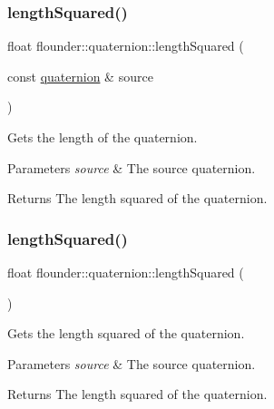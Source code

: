 \subsubsection{\texorpdfstring{length\+Squared()}{lengthSquared()}\hspace{0.1cm}{\footnotesize\ttfamily [1/2]}}
{\footnotesize\ttfamily float flounder\+::quaternion\+::length\+Squared (\begin{DoxyParamCaption}\item[{const \hyperlink{classflounder_1_1quaternion}{quaternion} \&}]{source }\end{DoxyParamCaption})\hspace{0.3cm}{\ttfamily [static]}}



Gets the length of the quaternion. 


\begin{DoxyParams}{Parameters}
{\em source} & The source quaternion. \\
\hline
\end{DoxyParams}
\begin{DoxyReturn}{Returns}
The length squared of the quaternion. 
\end{DoxyReturn}
\mbox{\label{classflounder_1_1quaternion_a3513c1cae67023bab1f4647abf6f9075}} 
\subsubsection{\texorpdfstring{length\+Squared()}{lengthSquared()}\hspace{0.1cm}{\footnotesize\ttfamily [2/2]}}
{\footnotesize\ttfamily float flounder\+::quaternion\+::length\+Squared (\begin{DoxyParamCaption}{ }\end{DoxyParamCaption})}



Gets the length squared of the quaternion. 


\begin{DoxyParams}{Parameters}
{\em source} & The source quaternion. \\
\hline
\end{DoxyParams}
\begin{DoxyReturn}{Returns}
The length squared of the quaternion. 
\end{DoxyReturn}
\mbox{\label{classflounder_1_1quaternion_a3ffb73ee7a773996fd78f428e6a0e151}} 
